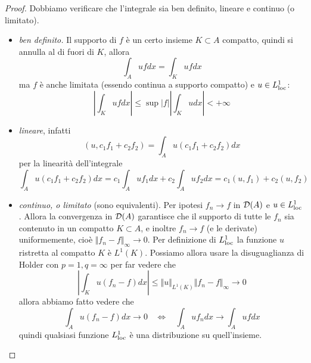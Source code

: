 \begin{proof}

Dobbiamo verificare che l'integrale sia ben definito, lineare e continuo (o limitato).
\begin{itemize}
\item \textit{ben definito.} Il supporto di $f$ è un certo insieme $K\subset A$ compatto, quindi si annulla al di fuori di $K$, allora
\begin{equation*}
\int_{A} ufdx = \int_{K} ufdx
\end{equation*}ma $f$ è anche limitata (essendo continua a supporto compatto) e $u\in L^{1}_{\operatorname{loc}}$:
\begin{equation*}
\left| \int_{K} ufdx\right| \leq \sup | f| \left| \int_{K} udx\right| < + \infty
\end{equation*}
\item \textit{lineare}, infatti
\begin{equation*}
(u, c_{1} f_{1} + c_{2} f_{2}) = \int_{A} u(c_{1} f_{1} + c_{2} f_{2}) dx
\end{equation*}per la linearità dell'integrale
\begin{equation*}
\int_{A} u(c_{1} f_{1} + c_{2} f_{2}) dx = c_{1}\int_{A} uf_{1} dx + c_{2}\int_{A} uf_{2} dx = c_{1}(u, f_{1}) + c_{2}(u, f_{2})
\end{equation*}
\item \textit{continuo, o limitato} (sono equivalenti). Per ipotesi $f_{n}\rightarrow f$ in $\mathcal{D}(A)$ e $u\in L^{1}_{\operatorname{loc}}$. Allora la convergenza in $\mathcal{D}(A)$ garantisce che il supporto di tutte le $f_{n}$ sia contenuto in un compatto $K\subset A$, e inoltre $f_{n}\rightarrow f$ (e le derivate) uniformemente, cioè $ \Vert f_{n} - f \Vert_{\infty}\rightarrow 0$. Per definizione di $L^{1}_{\operatorname{loc}}$ la funzione $u$ ristretta al compatto $K$ è $L^{1}(K)$. Possiamo allora usare la disuguaglianza di Holder con $p = 1, q = \infty $ per far vedere che
\begin{equation*}
\left| \int_{K} u(f_{n} - f) dx\right| \leq \Vert u \Vert_{L^{1}(K)} \Vert f_{n} - f \Vert_{\infty}\rightarrow 0
\end{equation*}allora abbiamo fatto vedere che
\begin{equation*}
\int_{A} u(f_{n} - f) dx\rightarrow 0\ \ \ \ \iff \ \ \ \ \int_{A} uf_{n} dx\rightarrow \int_{A} ufdx
\end{equation*}quindi qualsiasi funzione $L^{1}_{\operatorname{loc}}$ è una distribuzione su quell'insieme.
\end{itemize}
\end{proof}

